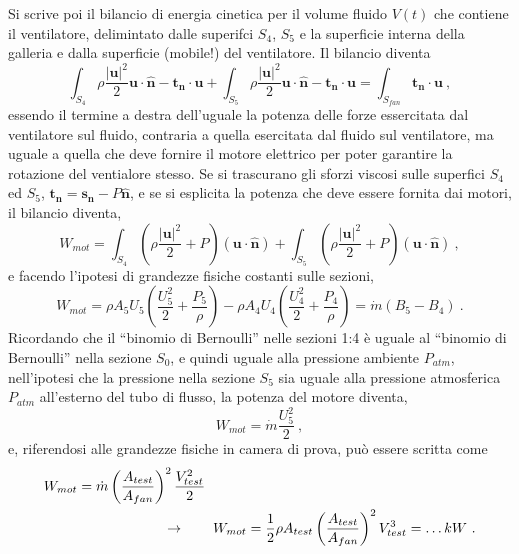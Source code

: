 Si scrive poi il bilancio di energia cinetica per il volume fluido $V(t)$ che contiene il ventilatore, delimintato dalle superifci $S_4$, $S_5$ e la superficie interna della galleria e dalla superficie (mobile!) del ventilatore. Il bilancio diventa
\begin{equation}
\int_{S_4} \rho \dfrac{|\bm{u}|^2}{2} \bm{u} \cdot \bm{\hat{n}} - \bm{t_n} \cdot \bm{u} + 
\int_{S_5} \rho \dfrac{|\bm{u}|^2}{2} \bm{u} \cdot \bm{\hat{n}} - \bm{t_n} \cdot \bm{u} = \int_{S_{fan}} \bm{t_n} \cdot \bm{u} \ ,
\end{equation}
essendo il termine a destra dell'uguale la potenza delle forze essercitata dal ventilatore sul fluido, contraria a quella esercitata dal fluido sul ventilatore, ma uguale a quella che deve fornire il motore elettrico per poter garantire la rotazione del ventialore stesso. Se si trascurano gli sforzi viscosi sulle superfici $S_4$ ed $S_5$, $\bm{t_n} = \bm{s_n} - P \bm{\hat{n}}$, e se si esplicita la potenza che deve essere fornita dai motori, il bilancio diventa,
\begin{equation}
 W_{mot} = 
\int_{S_4} \left( \rho \dfrac{|\bm{u}|^2}{2} + P \right) \left( \bm{u} \cdot \bm{\hat{n}} \right)  + 
\int_{S_5} \left( \rho \dfrac{|\bm{u}|^2}{2} + P \right) \left( \bm{u} \cdot \bm{\hat{n}} \right) \ , 
\end{equation}
e facendo l'ipotesi di grandezze fisiche costanti sulle sezioni,
\begin{equation}
 W_{mot} = \rho A_5 U_5 \left( \dfrac{U_5^2}{2} + \dfrac{P_5}{\rho} \right) 
         - \rho A_4 U_4 \left( \dfrac{U_4^2}{2} + \dfrac{P_4}{\rho} \right)
         = \dot{m} \left( B_5 - B_4 \right) \ . 
\end{equation}
Ricordando che il ``binomio di Bernoulli'' nelle sezioni 1:4 è uguale al ``binomio di Bernoulli'' nella sezione $S_0$, e quindi uguale alla pressione ambiente $P_{atm}$, nell'ipotesi che la pressione nella sezione $S_5$ sia uguale alla pressione atmosferica $P_{atm}$ all'esterno del tubo di flusso, la potenza del motore diventa,
\begin{equation}
 W_{mot} = \dot{m} \dfrac{U_5^2}{2} \ ,
\end{equation}
e, riferendosi alle grandezze fisiche in camera di prova, può essere scritta come
\begin{equation}
\begin{aligned}
 & W_{mot} = \dot{m} \left( \dfrac{A_{test}}{A_{fan}} \right)^2 \dfrac{V_{test}^2}{2} \\
 & \hspace{3.0cm} \rightarrow \qquad 
 W_{mot} = \dfrac{1}{2} \rho A_{test} \left( \dfrac{A_{test}}{A_{fan}} \right)^2 V_{test}^3 = \dots kW \ .
\end{aligned}
\end{equation}

